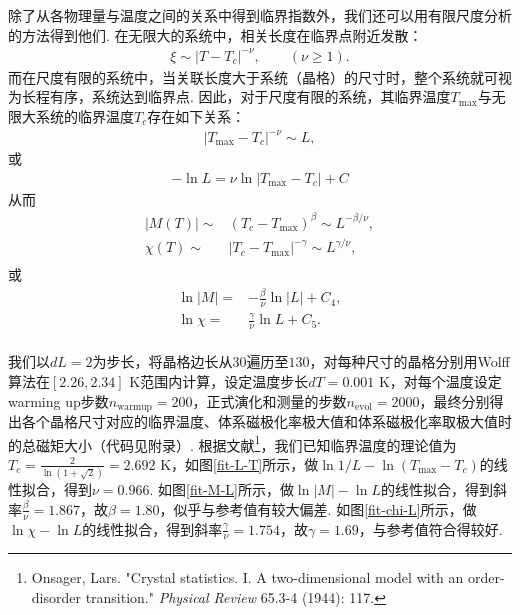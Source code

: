 \documentclass[UTF8,10pt,a4paper]{article}
\theoremstyle{Problem}
\theoremstyle{Solution}
\providecommand{\abs}[1]{\left\lvert#1\right\rvert}
\begin{document}
除了从各物理量与温度之间的关系中得到临界指数外，我们还可以用有限尺度分析的方法得到他们. 在无限大的系统中，相关长度在临界点附近发散：
\begin{align}
    \xi\sim\abs{T-T_c}^{-\nu},\qquad(\nu\geq 1).
\end{align}
而在尺度有限的系统中，当关联长度大于系统（晶格）的尺寸时，整个系统就可视为长程有序，系统达到临界点. 因此，对于尺度有限的系统，其临界温度$T_{\max}$与无限大系统的临界温度$T_c$存在如下关系：
\begin{align}
    \abs{T_{\max}-T_c}^{-\nu}\sim L,
\end{align}
或
\begin{align}
    -\ln L=\nu\ln\abs{T_{\max}-T_c}+C
\end{align}
从而
\begin{align}
    \abs{M(T)}\sim&(T_c-T_{\max})^{\beta}\sim L^{-\beta/\nu},\\
    \chi(T)\sim&\abs{T_c-T_{\max}}^{-\gamma}\sim L^{\gamma/\nu},\\
\end{align}
或
\begin{align}
    \ln\abs{M}=&-\frac{\beta}{\nu}\ln\abs L+C_4,\\
    \ln\chi=&\frac{\gamma}{\nu}\ln L+C_5.\\
\end{align}

我们以$dL=2$为步长，将晶格边长从$30$遍历至$130$，对每种尺寸的晶格分别用Wolff算法在$[2.26,2.34]$ K范围内计算，设定温度步长$dT=0.001$ K，对每个温度设定warming up步数$n_{\text{warmup}}=200$，正式演化和测量的步数$n_{\text{evol}}=2000$，最终分别得出各个晶格尺寸对应的临界温度、体系磁极化率极大值和体系磁极化率取极大值时的总磁矩大小（代码见附录）. 根据文献\footnote{Onsager, Lars. "Crystal statistics. I. A two-dimensional model with an order-disorder transition." \textit{Physical Review} 65.3-4 (1944): 117.}，我们已知临界温度的理论值为$T_c=\frac{2}{\ln(1+\sqrt{2})}=2.692$ K，如图\ref{fit-L-T}所示，做$\ln 1/L-\ln(T_{\max}-T_c)$的线性拟合，得到$\nu=0.966$. 如图\ref{fit-M-L}所示，做$\ln\abs{M}-\ln L$的线性拟合，得到斜率$\frac{\beta}{\nu}=1.867$，故$\beta=1.80$，似乎与参考值有较大偏差. 如图\ref{fit-chi-L}所示，做$\ln\chi-\ln L$的线性拟合，得到斜率$\frac{\gamma}{\nu}=1.754$，故$\gamma=1.69$，与参考值符合得较好.
\end{document}
